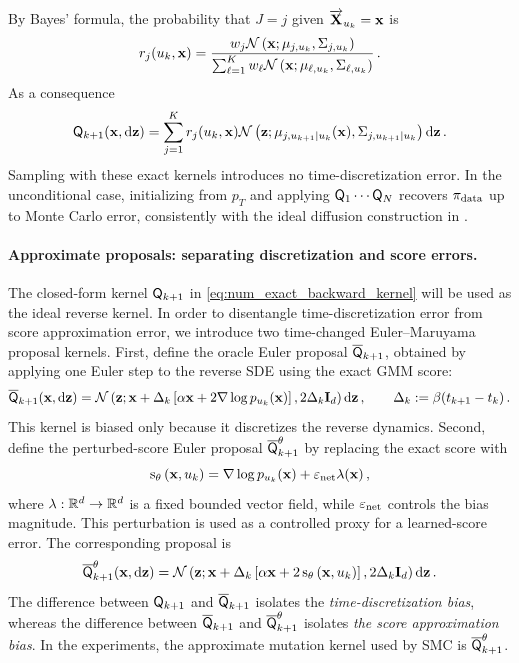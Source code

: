 \documentclass[11pt]{article}
\theoremstyle{plain}
\theoremstyle{definition}
\theoremstyle{remark}
\begin{document}
By Bayes' formula, the probability that $J=j$ given $\overrightarrow{\mathbf{X}}_{u_k}=\mathbf{x}$ is
$$
r_j(u_k,\x)
=\frac{  w_j\gaussiand{\mu_{j,u_k}}{\Sigma_{j,u_k}}[\x] }{ \sum_{\ell=1}^{K} w_\ell \gaussiand{\mu_{\ell,u_k}}{\Sigma_{\ell,u_k}}[\x] } \eqsp .
$$
As a consequence
\begin{equation} \label{eq:num_exact_backward_kernel}
\mk{k+1}(\x,\rmd \z)  =  \sum_{j=1}^{K}  r_j(u_k,\x)  \gaussiand{ \mu_{j,u_{k+1}|u_k}(\x) }{ \Sigma_{j,u_{k+1}|u_k} }[\z] \rmd \z \eqsp.
\end{equation}
%
Sampling with these exact kernels introduces no time-discretization error. In
the unconditional case, initializing from $p_T$ and applying
$\mk{1}\cdots\mk{N}$ recovers $\pi_{\mathrm{data}}$ up to Monte Carlo error, consistently
with the ideal diffusion construction in .

\paragraph{Approximate proposals: separating discretization and score errors.}
The closed-form kernel $\mk{k+1}$ in \eqref{eq:num_exact_backward_kernel} will be used as the ideal reverse kernel. In order to disentangle time-discretization error from score approximation error, we introduce two time-changed Euler--Maruyama proposal kernels. First, define the oracle Euler proposal $\eulermk{k+1}$, obtained by applying
one Euler step to the reverse SDE using the exact GMM score:
\begin{equation}
\label{eq:num_oracle_euler_proposal}
\eulermk{k+1}(\x,\rmd \z) = \gaussiand{ \x+\Delta_k\left[ \isvp \x + 2\nabla\log p_{u_k}(\x) \right]
}{ 2\Delta_k \Id_d }[\z]\rmd \z \eqsp, \qquad \Delta_k\eqdef \beta(t_{k+1}-t_k) \eqsp.
\end{equation}
This kernel is biased only because it discretizes the reverse dynamics. Second, define the perturbed-score Euler proposal
$\eulermk{k+1}[\theta]$ by replacing the exact score with
$$
\scorenet[u_k][\x][\theta] = \nabla\log p_{u_k}(\x) + \varepsilon_{\rm net}\lambda(\x) \eqsp,
$$
where $\lambda:\mathbb{R}^d\to\mathbb{R}^d$ is a fixed bounded vector
field, while $\varepsilon_{\rm net}$ controls the bias magnitude.  This perturbation is used as a controlled proxy for a learned-score
error.  The corresponding proposal is
\begin{equation}
\label{eq:num_learned_euler_proposal}
\eulermk{k+1}[\theta](\x,\rmd \z) = \gaussiand{ \x+\Delta_k\left[ \isvp \x + 2 \scorenet[u_k][\x][\theta] \right] }{ 2 \Delta_k \Id_d }[\z]\rmd \z \eqsp .
\end{equation}
%
The difference between $\mk{k+1}$ and $\eulermk{k+1}$ isolates the
\emph{time-discretization bias}, whereas the difference between $\eulermk{k+1}$ and
$\eulermk{k+1}[\theta]$ isolates \emph{the score approximation bias}.
In the experiments, the approximate mutation kernel used by SMC is
$\eulermk{k+1}[\theta]$.
\end{document}
